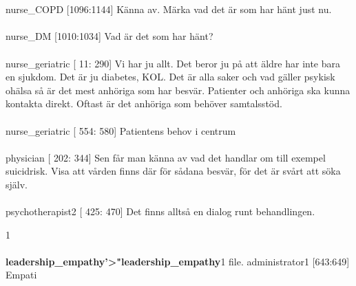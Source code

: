 \documentclass[12pt,a4paper,oneside]{article}
\begin{document}
\\\ \\
 nurse\_COPD [1096:1144] 
K{\"a}nna av. M{\"a}rka vad det {\"a}r som har h{\"a}nt just nu. %
\\\ \\
 nurse\_DM [1010:1034] 
Vad {\"a}r det som har h{\"a}nt? %
\\\ \\
 nurse\_geriatric [  11: 290] 
Vi har ju allt. Det beror ju p{\aa} att {\"a}ldre har inte bara en sjukdom. Det {\"a}r ju diabetes, KOL. Det {\"a}r alla saker och vad g{\"a}ller psykisk oh{\"a}lsa s{\aa} {\"a}r det mest anh{\"o}riga som har besv{\"a}r. Patienter och anh{\"o}riga ska kunna kontakta direkt. Oftast {\"a}r det anh{\"o}riga som beh{\"o}ver samtalsst{\"o}d.  %
\\\ \\
 nurse\_geriatric [ 554: 580] 
Patientens behov i centrum %
\\\ \\
 physician [ 202: 344] 
Sen f{\aa}r man k{\"a}nna av vad det handlar om till exempel suicidrisk. Visa att v{\aa}rden finns d{\"a}r f{\"o}r s{\aa}dana besv{\"a}r, f{\"o}r det {\"a}r sv{\aa}rt att s{\"o}ka sj{\"a}lv. %
\\\ \\
 psychotherapist2 [ 425: 470] 
Det finns allts{\aa} en dialog runt behandlingen. %

1 \\\ \\{\bf leadership\_empathy'>"leadership\_empathy}1 file.
 administrator1 [643:649] 
Empati %
\end{document}
